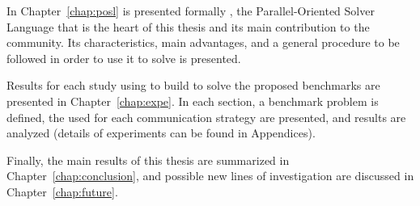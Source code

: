 In Chapter~\ref{chap:posl} is presented formally \posl, the Parallel-Oriented Solver Language that is the heart of this thesis and its main contribution to the community. Its characteristics, main advantages, and a general procedure to be followed in order to use it to solve \CSPs{} is
presented.

Results for each study using \posl{} to build \comstrs{} to solve the proposed benchmarks are presented in Chapter~\ref{chap:expe}. In each section, a benchmark problem is defined, the used \soset{} for each communication strategy are presented, and results are analyzed (details of experiments can be found in Appendices). 

Finally, the main results of this thesis are summarized in Chapter~\ref{chap:conclusion}, and possible new lines of investigation are discussed in Chapter~\ref{chap:future}.